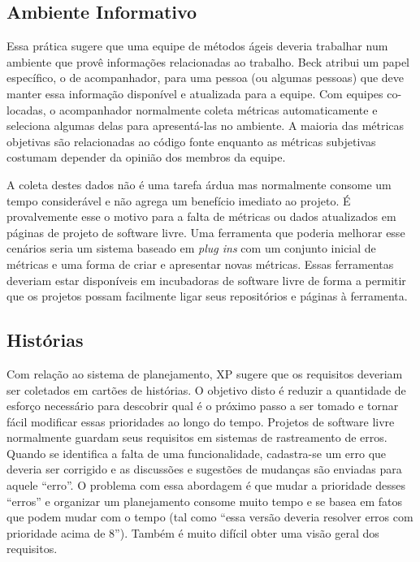 \subsection{Ambiente Informativo}
\label{subsec:inform-worksp}

Essa prática sugere que uma equipe de métodos ágeis deveria trabalhar
num ambiente que provê informações relacionadas ao trabalho. Beck
\cite{XP01} atribui um papel específico, o de acompanhador, para uma
pessoa (ou algumas pessoas) que deve manter essa informação disponível
e atualizada para a equipe. Com equipes co-locadas, o acompanhador
normalmente coleta métricas \cite{Sato2007} automaticamente e
seleciona algumas delas para apresentá-las no ambiente. A maioria das
métricas objetivas são relacionadas ao código fonte enquanto as
métricas subjetivas costumam depender da opinião dos membros da
equipe.

A coleta destes dados não é uma tarefa árdua mas normalmente consome
um tempo considerável e não agrega um benefício imediato ao projeto. É
provalvemente esse o motivo para a falta de métricas ou dados
atualizados em páginas de projeto de software livre. Uma ferramenta
que poderia melhorar esse cenários seria um sistema baseado em
\emph{plug ins} com um conjunto inicial de métricas e uma forma de
criar e apresentar novas métricas. Essas ferramentas deveriam estar
disponíveis em incubadoras de software livre de forma a permitir que
os projetos possam facilmente ligar seus repositórios e páginas à
ferramenta.

\subsection{Histórias}
\label{subsec:stories}

Com relação ao sistema de planejamento, XP sugere que os requisitos
deveriam ser coletados em cartões de histórias. O objetivo disto é
reduzir a quantidade de esforço necessário para descobrir qual é o
próximo passo a ser tomado e tornar fácil modificar essas prioridades
ao longo do tempo. Projetos de software livre normalmente guardam seus
requisitos em sistemas de rastreamento de erros. Quando se identifica
a falta de uma funcionalidade, cadastra-se um erro que deveria ser
corrigido e as discussões e sugestões de mudanças são enviadas para
aquele ``erro''. O problema com essa abordagem é que mudar a
prioridade desses ``erros'' e organizar um planejamento consome muito
tempo e se basea em fatos que podem mudar com o tempo (tal como ``essa
versão deveria resolver erros com prioridade acima de 8''). Também é
muito difícil obter uma visão geral dos requisitos.

